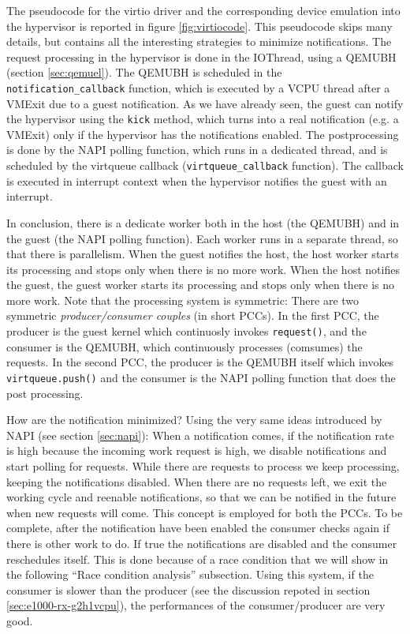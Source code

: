 The pseudocode for the virtio driver and the corresponding device emulation into the hypervisor is reported in figure
\ref{fig:virtiocode}. This pseudocode skips many details, but contains all the interesting strategies to minimize notifications.
The request processing in the hypervisor is done in the IOThread, using a QEMUBH (section \ref{sec:qemuel}). The QEMUBH is scheduled
in the \texttt{notification\_callback} function, which is executed by a VCPU thread after a VMExit due to a guest notification.
As we have already seen, the guest can notify the hypervisor using the \texttt{kick} method, which turns into a real notification
(e.g. a VMExit) only if the hypervisor has the notifications enabled.
The postprocessing is done by the NAPI polling function, which runs in a dedicated thread, and is scheduled by the virtqueue callback
(\texttt{virtqueue\_callback} function). The callback is executed in interrupt context when the hypervisor notifies the guest with
an interrupt.

\vspace{0.5cm}

In conclusion, there is a dedicate worker both in the host (the QEMUBH) and in the guest (the NAPI polling function). Each worker runs
in a separate thread, so that there is parallelism. When the guest notifies the host, the host worker starts its processing and stops
only when there is no more work. When the host notifies the guest, the guest worker starts its processing and stops only when there is
no more work. Note that the processing system is symmetric: There are two symmetric \emph{producer/consumer couples} (in short PCCs). In 
the first PCC, the producer is the guest kernel which continuosly invokes \texttt{request()}, and the consumer is the QEMUBH, which 
continuously processes (comsumes) the requests. In the second PCC, the producer is the QEMUBH itself which invokes 
\texttt{virtqueue.push()} and the consumer is the NAPI polling function that does the post processing.

\vspace{0.5cm}

How are the notification minimized? Using the very same ideas introduced by NAPI (see section \ref{sec:napi}): When a notification comes,
if the notification rate is high because the incoming work request is high, we disable notifications and start polling for
requests. While there are requests to process we keep processing, keeping the notifications disabled. When there are no requests left, we
exit the working cycle and reenable notifications, so that we can be notified in the future when new requests will come.
This concept is employed for both the PCCs. To be complete, after the notification have been enabled the consumer 
checks again if there is other work to do. If true the notifications are disabled and the consumer reschedules itself. This is done because
of a race condition that we will show in the following ``Race condition analysis'' subsection.
Using this system, if the consumer is slower than the producer (see the discussion repoted in section \ref{sec:e1000-rx-g2h1vcpu}), the 
performances of the consumer/producer are very good.

